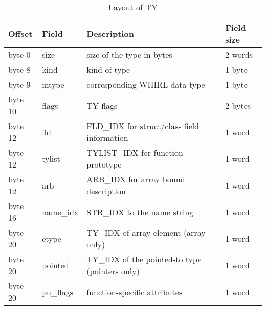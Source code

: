 \begin{table}[h]
\centering
\caption{Layout of TY} 
\label{Table_15} 
\begin{tabular}{|l|l|l|l|}\hline
Offset & Field & Description & Field size\\\hline\hline 
byte 0 & size & size of the type in bytes & 2 words \\\hline
byte 8 & kind & kind of type & 1 byte \\\hline
byte 9 & mtype & corresponding WHIRL data type & 1 byte \\\hline
byte 10 & flags &
\index{TY}%
TY flags & 2 bytes \\\hline
byte 12 & fld &
\index{FLD\_IDX}%
FLD\_IDX for struct/class field information & 1 word \\\hline
byte 12 & tylist &
\index{TYLIST\_IDX}%
TYLIST\_IDX for function prototype & 1 word \\\hline
byte 12 & arb &
\index{ARB\_IDX}%
ARB\_IDX for array bound description & 1 word \\\hline
byte 16 & name\_idx &
\index{STR\_IDX}%
STR\_IDX to the name string & 1 word \\\hline
byte 20 & etype &
\index{TY\_IDX}%
TY\_IDX of array element (array only) & 1 word \\\hline
byte 20 & pointed &
\index{TY\_IDX}%
TY\_IDX of the pointed-to type (pointers only) & 1 word \\\hline
byte 20 & pu\_flags & function-specific attributes & 1 word\\\hline
\end{tabular}
\end{table}

